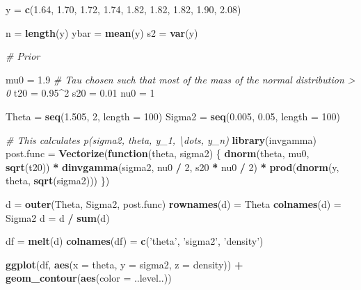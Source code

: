 \documentclass[]{article}
\newenvironment{Shaded}{\begin{snugshade}}{\end{snugshade}}
\newcommand{\CommentTok}[1]{\textcolor[rgb]{0.56,0.35,0.01}{\textit{#1}}}
\newcommand{\ControlFlowTok}[1]{\textcolor[rgb]{0.13,0.29,0.53}{\textbf{#1}}}
\newcommand{\DataTypeTok}[1]{\textcolor[rgb]{0.13,0.29,0.53}{#1}}
\newcommand{\DecValTok}[1]{\textcolor[rgb]{0.00,0.00,0.81}{#1}}
\newcommand{\FloatTok}[1]{\textcolor[rgb]{0.00,0.00,0.81}{#1}}
\newcommand{\KeywordTok}[1]{\textcolor[rgb]{0.13,0.29,0.53}{\textbf{#1}}}
\newcommand{\NormalTok}[1]{#1}
\newcommand{\OperatorTok}[1]{\textcolor[rgb]{0.81,0.36,0.00}{\textbf{#1}}}
\newcommand{\StringTok}[1]{\textcolor[rgb]{0.31,0.60,0.02}{#1}}
\begin{document}
\begin{Shaded}
\begin{Highlighting}[]
\NormalTok{y =}\StringTok{ }\KeywordTok{c}\NormalTok{(}\FloatTok{1.64}\NormalTok{, }\FloatTok{1.70}\NormalTok{, }\FloatTok{1.72}\NormalTok{, }\FloatTok{1.74}\NormalTok{, }\FloatTok{1.82}\NormalTok{, }\FloatTok{1.82}\NormalTok{, }\FloatTok{1.82}\NormalTok{, }\FloatTok{1.90}\NormalTok{, }\FloatTok{2.08}\NormalTok{)}

\NormalTok{n =}\StringTok{ }\KeywordTok{length}\NormalTok{(y)}
\NormalTok{ybar =}\StringTok{ }\KeywordTok{mean}\NormalTok{(y)}
\NormalTok{s2 =}\StringTok{ }\KeywordTok{var}\NormalTok{(y)}

\CommentTok{# Prior}

\NormalTok{mu0 =}\StringTok{ }\FloatTok{1.9}
\CommentTok{# Tau chosen such that most of the mass of the normal distribution > 0}
\NormalTok{t20 =}\StringTok{ }\FloatTok{0.95}\OperatorTok{^}\DecValTok{2}
\NormalTok{s20 =}\StringTok{ }\FloatTok{0.01}
\NormalTok{nu0 =}\StringTok{ }\DecValTok{1}

\NormalTok{Theta =}\StringTok{ }\KeywordTok{seq}\NormalTok{(}\FloatTok{1.505}\NormalTok{, }\DecValTok{2}\NormalTok{, }\DataTypeTok{length =} \DecValTok{100}\NormalTok{)}
\NormalTok{Sigma2 =}\StringTok{ }\KeywordTok{seq}\NormalTok{(}\FloatTok{0.005}\NormalTok{, }\FloatTok{0.05}\NormalTok{, }\DataTypeTok{length =} \DecValTok{100}\NormalTok{)}

\CommentTok{# This calculates p(sigma2, theta, y_1, \textbackslash{}dots, y_n)}
\KeywordTok{library}\NormalTok{(invgamma)}
\NormalTok{post.func =}\StringTok{ }\KeywordTok{Vectorize}\NormalTok{(}\ControlFlowTok{function}\NormalTok{(theta, sigma2) \{}
  \KeywordTok{dnorm}\NormalTok{(theta, mu0, }\KeywordTok{sqrt}\NormalTok{(t20)) }\OperatorTok{*}
\StringTok{    }\KeywordTok{dinvgamma}\NormalTok{(sigma2, nu0 }\OperatorTok{/}\StringTok{ }\DecValTok{2}\NormalTok{, s20 }\OperatorTok{*}\StringTok{ }\NormalTok{nu0 }\OperatorTok{/}\StringTok{ }\DecValTok{2}\NormalTok{) }\OperatorTok{*}
\StringTok{    }\KeywordTok{prod}\NormalTok{(}\KeywordTok{dnorm}\NormalTok{(y, theta, }\KeywordTok{sqrt}\NormalTok{(sigma2)))}
\NormalTok{\})}

\NormalTok{d =}\StringTok{ }\KeywordTok{outer}\NormalTok{(Theta, Sigma2, post.func)}
\KeywordTok{rownames}\NormalTok{(d) =}\StringTok{ }\NormalTok{Theta}
\KeywordTok{colnames}\NormalTok{(d) =}\StringTok{ }\NormalTok{Sigma2}
\NormalTok{d =}\StringTok{ }\NormalTok{d }\OperatorTok{/}\StringTok{ }\KeywordTok{sum}\NormalTok{(d)}

\NormalTok{df =}\StringTok{ }\KeywordTok{melt}\NormalTok{(d)}
\KeywordTok{colnames}\NormalTok{(df) =}\StringTok{ }\KeywordTok{c}\NormalTok{(}\StringTok{'theta'}\NormalTok{, }\StringTok{'sigma2'}\NormalTok{, }\StringTok{'density'}\NormalTok{)}

\KeywordTok{ggplot}\NormalTok{(df, }\KeywordTok{aes}\NormalTok{(}\DataTypeTok{x =}\NormalTok{ theta, }\DataTypeTok{y =}\NormalTok{ sigma2, }\DataTypeTok{z =}\NormalTok{ density)) }\OperatorTok{+}
\StringTok{  }\KeywordTok{geom_contour}\NormalTok{(}\KeywordTok{aes}\NormalTok{(}\DataTypeTok{color =}\NormalTok{ ..level..))}
\end{Highlighting}
\end{Shaded}
\end{document}

